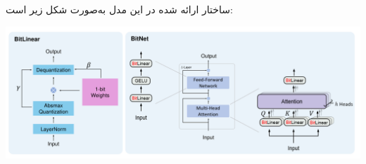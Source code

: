\begin{qsolve}
	
	ساختار ارائه شده در این مدل به‌صورت شکل زیر است:
	
	\begin{center}
		\includegraphics*[width=1\linewidth]{pics/img14.png}
		\label{ساختار ارائه شده در ref1}
	\end{center}
	
	
	
	
\end{qsolve}


